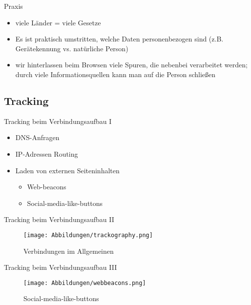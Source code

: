 \documentclass[hyperref={colorlinks,linkcolor=white}, utf8]{beamer}
\begin{document}
	\begin{frame}{Praxis}
		\begin{itemize}
			\item viele Länder = viele Gesetze
			\item Es ist praktisch umstritten, welche Daten personenbezogen sind (z.B. Gerätekennung vs. natürliche Person)
			\item wir hinterlassen beim Browsen viele Spuren, die nebenbei verarbeitet werden; durch viele Informationsquellen kann man auf die Person schließen
		\end{itemize}
	\end{frame}
	
	\subsection{Tracking}
	\begin{frame}{Tracking beim Verbindungsaufbau I}
		\begin{itemize}
			\item DNS-Anfragen
			\item IP-Adressen Routing
			\item Laden von externen Seiteninhalten
			\begin{itemize}
				\item Web-beacons
				\item Social-media-like-buttons
			\end{itemize}
		\end{itemize}
	\end{frame}
	
	\begin{frame}{Tracking beim Verbindungsaufbau II}
		\begin{figure}[H]
			\texttt{[image: Abbildungen/trackography.png]}
			\label{fig:trackography}
			\caption{Verbindungen im Allgemeinen}
		\end{figure}
	\end{frame}
	
	\begin{frame}{Tracking beim Verbindungsaufbau III}
		\begin{figure}[H]
			\texttt{[image: Abbildungen/webbeacons.png]}
			\label{fig:webbeacons}
			\caption{Social-media-like-buttons}
		\end{figure}
	\end{frame}
	
\end{document}
